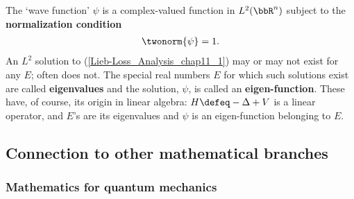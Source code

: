 \documentclass[openany, a4paper, oneside]{jsbook}
\begin{document}
The `wave function' $\psi$ is a complex-valued function in $L^2 (\bbR^n)$ subject to the \textbf{normalization condition}
\begin{align}
 \twonorm{\psi} = 1.
\end{align}
An $L^2$ solution to (\ref{Lieb-Loss_Analysis_chap11_1}) may or may not exist for any $E$; often does not.
The special real numbers $E$ for which such solutions exist are called \textbf{eigenvalues} and the solution,
$\psi$, is called an \textbf{eigen-function}.
These have, of course, its origin in linear algebra: $H \defeq - \Delta + V$ is a linear operator,
and $E$'s are its eigenvalues and $\psi$ is an eigen-function belonging to $E$.
\subsection{Connection to other mathematical branches}

\subsubsection{Mathematics for quantum mechanics}
\end{document}
